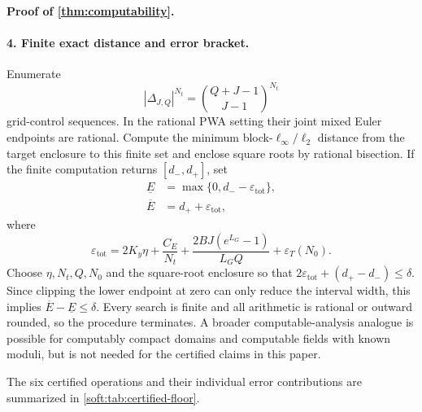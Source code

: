 \documentclass[twoside,11pt]{article}
\renewenvironment{proof}[1][Proof]{\par\noindent\textbf{#1.}\ }{\hfill\BlackBox\par\medskip}
\begin{document}
\begin{proof}[Proof of \cref{thm:computability}]
\paragraph{4. Finite exact distance and error bracket.}
Enumerate
\[
  \left|\Delta_{J,Q}\right|^{N_t}
  =\binom{Q+J-1}{J-1}^{N_t}
\]
grid-control sequences.  In the rational PWA setting their joint mixed Euler endpoints are rational.  Compute the minimum block-$\ell_\infty/\ell_2$ distance from the target enclosure to this finite set and enclose square roots by rational bisection.  If the finite computation returns $[d_-,d_+]$, set
\begin{align}
  \underline E&=\max\{0,d_- -\varepsilon_{\mathrm{tot}}\},\\
  \overline E&=d_+ +\varepsilon_{\mathrm{tot}},
\end{align}
where
\[
  \varepsilon_{\mathrm{tot}}
  =2K_y\eta+\frac{C_E}{N_t}
  +\frac{2BJ(e^{L_G}-1)}{L_GQ}
  +\varepsilon_T(N_0).
\]
Choose $\eta,N_t,Q,N_0$ and the square-root enclosure so that $2\varepsilon_{\mathrm{tot}}+(d_+-d_-)\le\delta$.  Since clipping the lower endpoint at zero can only reduce the interval width, this implies $\overline E-\underline E\le\delta$.  Every search is finite and all arithmetic is rational or outward rounded, so the procedure terminates.  A broader computable-analysis analogue is possible for computably compact domains and computable fields with known moduli, but is not needed for the certified claims in this paper.
\end{proof}

The six certified operations and their individual error contributions are summarized in \cref{soft:tab:certified-floor}.
\end{document}
